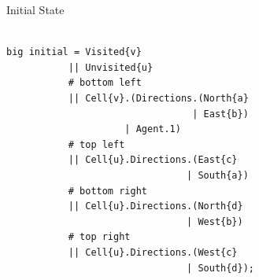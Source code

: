\documentclass{beamer}
\begin{document}
\begin{frame}[fragile]{Initial State}
\begin{lstlisting}

big initial = Visited{v}
           || Unvisited{u}
           # bottom left
           || Cell{v}.(Directions.(North{a}
                                 | East{b})
                     | Agent.1)
           # top left
           || Cell{u}.Directions.(East{c}
                                | South{a})
           # bottom right
           || Cell{u}.Directions.(North{d}
                                | West{b})
           # top right
           || Cell{u}.Directions.(West{c}
                                | South{d});

\end{lstlisting}
\end{frame}
\end{document}
